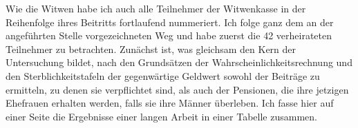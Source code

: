 \par{}\smallskip
Wie die Witwen habe ich auch alle Teilnehmer der Witwenkasse in der Reihenfolge ihres Beitritts fortlaufend nummeriert. Ich folge ganz dem an der angeführten Stelle vorgezeichneten Weg und habe zuerst die 42 verheirateten Teilnehmer zu betrachten. Zunächst ist, was gleichsam den Kern der Untersuchung bildet, nach den Grundsätzen der Wahrscheinlichkeitsrechnung und den Sterblichkeitstafeln der gegenwärtige Geldwert sowohl der Beiträge zu ermitteln, zu denen sie verpflichtet sind, als auch der Pensionen, die ihre jetzigen Ehefrauen erhalten werden, falls sie ihre Männer überleben. Ich fasse hier auf einer Seite die Ergebnisse einer langen Arbeit in einer Tabelle zusammen.

